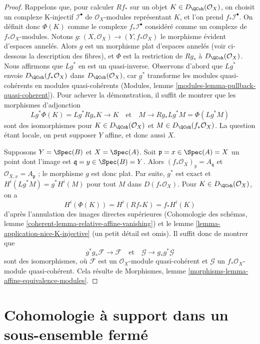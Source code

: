 \begin{proof}
Rappelons que, pour calculer $Rf_*$ sur un objet $K \in D_\QCoh(\mathcal{O}_X)$,
on choisit un complexe K-injectif $\mathcal{I}^\bullet$ de
$\mathcal{O}_X$-modules représentant $K$, et l'on prend $f_*\mathcal{I}^\bullet$.
On définit donc $\Phi(K)$ comme le complexe $f_*\mathcal{I}^\bullet$
considéré comme un complexe de $f_*\mathcal{O}_X$-modules.
Notons $g : (X, \mathcal{O}_X) \to (Y, f_*\mathcal{O}_X)$ le
morphisme évident d'espaces annelés. Alors $g$ est un morphisme plat
d'espaces annelés (voir ci-dessous la description des fibres), et
$\Phi$ est la restriction de $Rg_*$ à $D_\QCoh(\mathcal{O}_X)$.
Nous affirmons que $Lg^*$ en est un quasi-inverse. Observons d'abord que
$Lg^*$ envoie $D_\QCoh(f_*\mathcal{O}_X)$ dans $D_\QCoh(\mathcal{O}_X)$,
car $g^*$ transforme les modules quasi-cohérents en modules quasi-cohérents
(Modules, lemme \ref{modules-lemma-pullback-quasi-coherent}).
Pour achever la démonstration, il suffit de montrer que
les morphismes d'adjonction
$$
Lg^*\Phi(K) = Lg^*Rg_*K \to K
\quad\text{et}\quad
M \to Rg_*Lg^*M = \Phi(Lg^*M)
$$
sont des isomorphismes pour $K \in D_\QCoh(\mathcal{O}_X)$ et
$M \in D_\QCoh(f_*\mathcal{O}_X)$. La question étant locale,
on peut supposer $Y$ affine, et donc aussi $X$.

\medskip\noindent
Supposons $Y = \Spec(B)$ et $X = \Spec(A)$. Soit
$\mathfrak p = x \in \Spec(A) = X$ un point dont l'image est
$\mathfrak q = y \in \Spec(B) = Y$. Alors
$(f_*\mathcal{O}_X)_y = A_\mathfrak q$ et $\mathcal{O}_{X, x} = A_\mathfrak p$ ;
le morphisme $g$ est donc plat. Par suite, $g^*$ est exact et $H^i(Lg^*M) = g^*H^i(M)$
pour tout $M$ dans $D(f_*\mathcal{O}_X)$.
Pour $K \in D_\QCoh(\mathcal{O}_X)$, on a
$$
H^i(\Phi(K)) = H^i(Rf_*K) = f_*H^i(K)
$$
d'après l'annulation des images directes supérieures
(Cohomologie des schémas, lemme \ref{coherent-lemma-relative-affine-vanishing})
et le lemme \ref{lemma-application-nice-K-injective} (un petit détail est omis).
Il suffit donc de montrer que
$$
g^*g_*\mathcal{F} \to \mathcal{F}
\quad\text{et}\quad
\mathcal{G} \to g_*g^*\mathcal{G}
$$
sont des isomorphismes, où $\mathcal{F}$ est
un $\mathcal{O}_X$-module quasi-cohérent et $\mathcal{G}$
un $f_*\mathcal{O}_X$-module quasi-cohérent. Cela résulte de
Morphismes, lemme \ref{morphisms-lemma-affine-equivalence-modules}.
\end{proof}




\section{Cohomologie à support dans un sous-ensemble fermé}
\label{section-cohomology-support}

